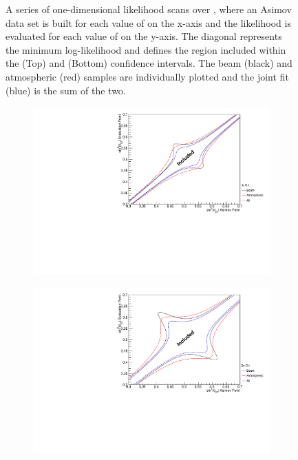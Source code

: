 \begin{figure}[h]
\begin{subfigure}[t]{1.0\textwidth}
  \end{subfigure}
  \caption{A series of one-dimensional likelihood scans over , where an Asimov data set is built for each value of  on the x-axis and the likelihood is evaluated for each value of  on the y-axis. The diagonal represents the minimum log-likelihood and defines the region included within the \quickmath{1\sigma} (Top) and \quickmath{2\sigma} (Bottom) confidence intervals. The beam (black) and atmospheric (red) samples are individually plotted and the joint fit (blue) is the sum of the two.}
  \label{fig:OscillationAnalysis_AsimovEval_DCP}
\end{figure}

\begin{figure}[h]
  \begin{subfigure}[t]{1.0\textwidth}
    \includegraphics[width=\textwidth, trim={0mm 0mm 0mm 0mm}, clip,page=1]{Figures/OA/TH23_Scans_1Sig.pdf}
  \end{subfigure}                                                                                                                                                                                          
  \begin{subfigure}[t]{1.0\textwidth}
    \includegraphics[width=\textwidth, trim={0mm 0mm 0mm 0mm}, clip,page=1]{Figures/OA/TH23_Scans_2Sig.pdf}

\end{subfigure}
\end{figure}
